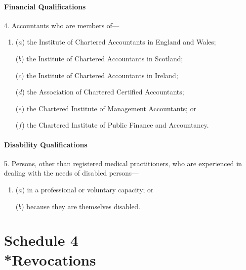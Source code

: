 \documentclass[12pt,a4paper]{article}
\begin{document}
\subsection*{Financial Qualifications}

4.  Accountants who are members of—
\begin{enumerate}\item[]
($a$) the Institute of Chartered Accountants in England and Wales;

($b$) the Institute of Chartered Accountants in Scotland;

($c$) the Institute of Chartered Accountants in Ireland;

($d$) the Association of Chartered Certified Accountants;

($e$) the Chartered Institute of Management Accountants; or

($f$) the Chartered Institute of Public Finance and Accountancy.
\end{enumerate}

\subsection*{Disability Qualifications}

5.  Persons, other than registered medical practitioners, who are experienced in dealing with the needs of disabled persons—
\begin{enumerate}\item[]
($a$) in a professional or voluntary capacity; or

($b$) because they are themselves disabled.
\end{enumerate}

\clearpage

\part[Schedule 4 --- Revocations]{Schedule 4\\*Revocations}

\renewcommand\parthead{--- Schedule 4}
\end{document}
